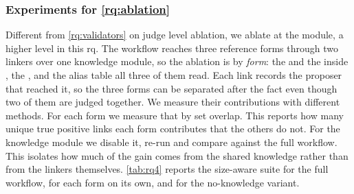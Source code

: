 \subsubsection{Experiments for \ref{rq:ablation}}
\label{sec:exp:rq4}
Different from \autoref{rq:validators} on judge level ablation, we ablate \approach{} at the module, a higher level in this rq.
The workflow reaches three reference forms through two linkers over one knowledge module, so the ablation is by \emph{form}: the \linkerB{} and the \linkerD{} inside \linkerN{}, the \linkerC{}, and the alias table all three of them read.
Each link records the proposer that reached it, so the three forms can be separated after the fact even though two of them are judged together.
We measure their contributions with different methods.
For each form we measure that by set overlap.
This reports how many unique true positive links each form contributes that the others do not.
For the knowledge module we disable it, re-run and compare against the full workflow.
This isolates how much of the gain comes from the shared knowledge rather than from the linkers themselves.
\autoref{tab:rq4} reports the size-aware suite for the full workflow, for each form on its own, and for the no-knowledge variant.



